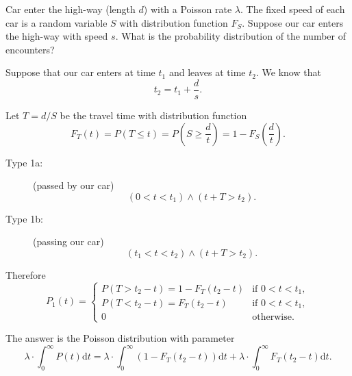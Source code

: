 \begin{example}
Car enter the high-way (length $ d $) with a Poisson rate $ \lambda $. The fixed speed of each car is a random variable $ S $ with distribution function $ F_{S} $. Suppose our car enters the high-way with speed $ s $. What is the probability distribution of the number of encounters?

Suppose that our car enters at time $ t_{1} $ and leaves at time $ t_{2} $. We know that
\[ t_{2} = t_{1} + \frac{d}{s}. \]

Let $ T = d / S $ be the travel time with distribution function
\[ F_{T}(t) = P(T \le t) = P \left( S \ge \frac{d}{t} \right) = 1 - F_{S} \left( \frac{d}{t} \right). \]

\begin{description}
  \item[Type 1a:] (passed by our car) \\
    \[ (0 < t < t_{1}) \wedge (t + T > t_{2}). \]
  \item[Type 1b:] (passing our car) \\
    \[ (t_{1} < t < t_{2}) \wedge (t + T > t_{2}). \]
\end{description}

Therefore
\[ P_{1}(t) =
  \begin{cases}
    P(T > t_{2} - t) = 1 - F_{T}(t_{2} - t)   & \text{if } 0 < t < t_{1}, \\
    P(T < t_{2} - t) = F_{T}(t_{2} - t)       & \text{if } 0 < t < t_{1}, \\
    0                                         & \text{otherwise}.
  \end{cases} \]

The answer is the Poisson distribution with parameter
\[ \lambda \cdot \int_{0}^{\infty} P(t) \mathrm{d}t = \lambda \cdot \int_{0}^{\infty} (1 - F_{T}(t_{2} - t)) \mathrm{d}t + \lambda \cdot \int_{0}^{\infty} F_{T}(t_{2} - t) \mathrm{d}t. \]
\end{example}

